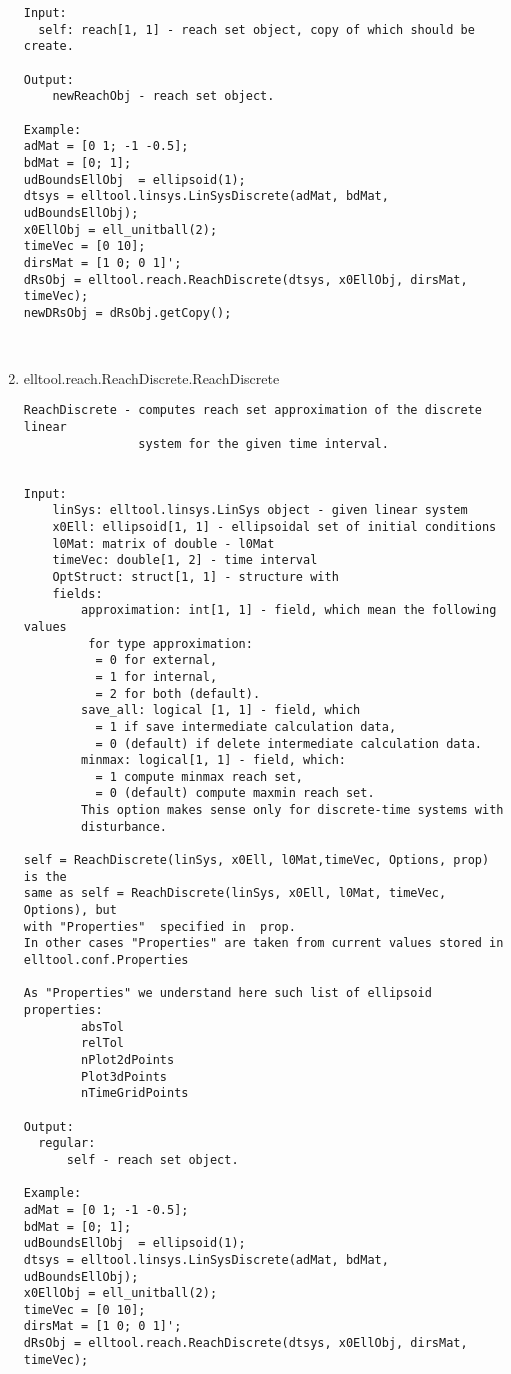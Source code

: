 \begin{enumerate}
\begin{lstlisting}
Input:
  self: reach[1, 1] - reach set object, copy of which should be create.

Output:
    newReachObj - reach set object.

Example:
adMat = [0 1; -1 -0.5];
bdMat = [0; 1];
udBoundsEllObj  = ellipsoid(1);
dtsys = elltool.linsys.LinSysDiscrete(adMat, bdMat, udBoundsEllObj);
x0EllObj = ell_unitball(2);
timeVec = [0 10];
dirsMat = [1 0; 0 1]';
dRsObj = elltool.reach.ReachDiscrete(dtsys, x0EllObj, dirsMat, timeVec);
newDRsObj = dRsObj.getCopy();



\end{lstlisting}
\fontfamily{\familydefault}
\selectfont
\item {elltool.reach.ReachDiscrete.ReachDiscrete}
\selectfont
\begin{lstlisting}
ReachDiscrete - computes reach set approximation of the discrete linear
                system for the given time interval.


Input:
    linSys: elltool.linsys.LinSys object - given linear system
    x0Ell: ellipsoid[1, 1] - ellipsoidal set of initial conditions
    l0Mat: matrix of double - l0Mat
    timeVec: double[1, 2] - time interval
    OptStruct: struct[1, 1] - structure with
    fields:
        approximation: int[1, 1] - field, which mean the following values
         for type approximation:
          = 0 for external,
          = 1 for internal,
          = 2 for both (default).
        save_all: logical [1, 1] - field, which
          = 1 if save intermediate calculation data,
          = 0 (default) if delete intermediate calculation data.
        minmax: logical[1, 1] - field, which:
          = 1 compute minmax reach set,
          = 0 (default) compute maxmin reach set.
        This option makes sense only for discrete-time systems with
        disturbance.

self = ReachDiscrete(linSys, x0Ell, l0Mat,timeVec, Options, prop) is the
same as self = ReachDiscrete(linSys, x0Ell, l0Mat, timeVec, Options), but
with "Properties"  specified in  prop.
In other cases "Properties" are taken from current values stored in
elltool.conf.Properties

As "Properties" we understand here such list of ellipsoid properties:
        absTol
        relTol
        nPlot2dPoints
        Plot3dPoints
        nTimeGridPoints

Output:
  regular:
      self - reach set object.

Example:
adMat = [0 1; -1 -0.5];
bdMat = [0; 1];
udBoundsEllObj  = ellipsoid(1);
dtsys = elltool.linsys.LinSysDiscrete(adMat, bdMat, udBoundsEllObj);
x0EllObj = ell_unitball(2);
timeVec = [0 10];
dirsMat = [1 0; 0 1]';
dRsObj = elltool.reach.ReachDiscrete(dtsys, x0EllObj, dirsMat, timeVec);





\end{lstlisting}
\end{enumerate}
